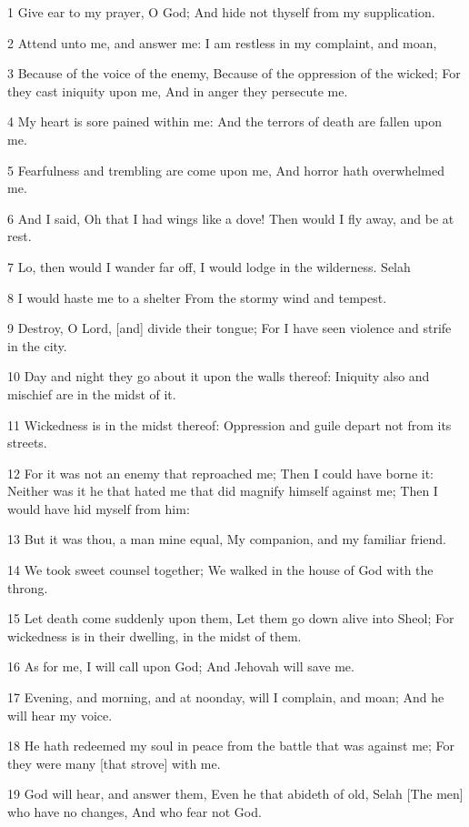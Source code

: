 \par 1 Give ear to my prayer, O God; And hide not thyself from my supplication.
\par 2 Attend unto me, and answer me: I am restless in my complaint, and moan,
\par 3 Because of the voice of the enemy, Because of the oppression of the wicked; For they cast iniquity upon me, And in anger they persecute me.
\par 4 My heart is sore pained within me: And the terrors of death are fallen upon me.
\par 5 Fearfulness and trembling are come upon me, And horror hath overwhelmed me.
\par 6 And I said, Oh that I had wings like a dove! Then would I fly away, and be at rest.
\par 7 Lo, then would I wander far off, I would lodge in the wilderness. Selah
\par 8 I would haste me to a shelter From the stormy wind and tempest.
\par 9 Destroy, O Lord, [and] divide their tongue; For I have seen violence and strife in the city.
\par 10 Day and night they go about it upon the walls thereof: Iniquity also and mischief are in the midst of it.
\par 11 Wickedness is in the midst thereof: Oppression and guile depart not from its streets.
\par 12 For it was not an enemy that reproached me; Then I could have borne it: Neither was it he that hated me that did magnify himself against me; Then I would have hid myself from him:
\par 13 But it was thou, a man mine equal, My companion, and my familiar friend.
\par 14 We took sweet counsel together; We walked in the house of God with the throng.
\par 15 Let death come suddenly upon them, Let them go down alive into Sheol; For wickedness is in their dwelling, in the midst of them.
\par 16 As for me, I will call upon God; And Jehovah will save me.
\par 17 Evening, and morning, and at noonday, will I complain, and moan; And he will hear my voice.
\par 18 He hath redeemed my soul in peace from the battle that was against me; For they were many [that strove] with me.
\par 19 God will hear, and answer them, Even he that abideth of old, Selah [The men] who have no changes, And who fear not God.
